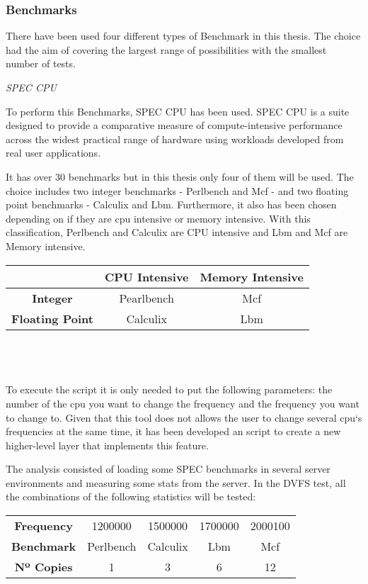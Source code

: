 \subsubsection{Benchmarks}

There have been used four different types of Benchmark in this thesis. The choice had the aim of covering the largest range of possibilities with the smallest number of tests. \cite{specCPU}

\emph{SPEC CPU}

To perform this Benchmarks, SPEC CPU has been used. SPEC CPU is a suite designed to provide a comparative measure of compute-intensive performance across the widest practical range of hardware using workloads developed from real user applications.

It has over 30 benchmarks but in this thesis only four of them will be used. The choice includes two integer benchmarks - Perlbench and Mcf - and two floating point benchmarks - Calculix and Lbm. 
Furthermore, it also has been chosen depending on if they are cpu intensive or memory intensive. With this classification, Perlbench and Calculix are CPU intensive and Lbm and Mcf are Memory intensive.

\begin{tabular}{ c| cc}
  \bf  & CPU Intensive & Memory Intensive \\
  \hline
  \bf Integer  & Pearlbench & Mcf \\
  \bf Floating Point  & Calculix & Lbm \\
\end{tabular}

\ \\ \ \\ \ \\
To execute the script it is only needed to put the following parameters: the number of the cpu you want to change the frequency and the frequency you want to change to. Given that this tool does not allows the user to change several cpu`s frequencies at the same time, it has been developed an script to create a new higher-level layer that implements this feature.

The analysis consisted of loading some SPEC benchmarks in several server environments and measuring some stats from the server. In the DVFS test, all the combinations of the following statistics will be tested:

\begin{tabular}{ c| cccc}
  \bf Frequency & 1200000 & 1500000 & 1700000 & 2000100 \\
  \bf Benchmark & Perlbench & Calculix  & Lbm & Mcf \\
  \bf Nº Copies & 1 & 3       & 6  & 12\\
\end{tabular}


